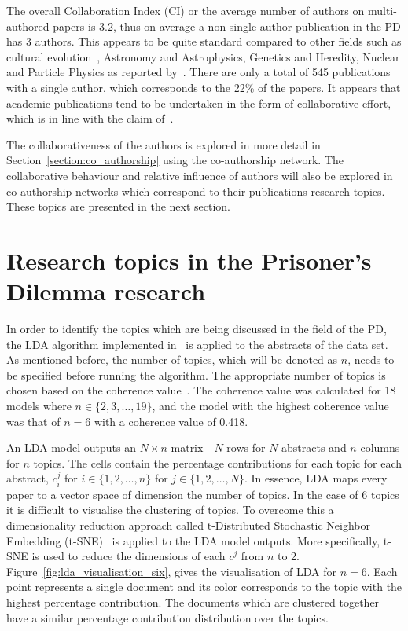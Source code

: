 \documentclass{article}
\theoremstyle{definition}
\begin{document}
The overall Collaboration Index (CI) or the average number of authors on
multi-authored papers is 3.2, thus on average a non single author publication in
the PD has 3 authors. This appears to be quite standard compared to other fields
such as cultural evolution~\cite{youngblood2018}, Astronomy and Astrophysics,
Genetics and Heredity, Nuclear and Particle Physics as reported
by~\cite{nature_author_blog}.
There are only a total of 545 publications with a single author, which
corresponds to the 22\% of the papers. It appears that academic publications
tend to be undertaken in the form of collaborative effort, which is in line
with the claim of~\cite{Kyvik2017}.

The collaborativeness of the authors is explored in more detail in
Section~\ref{section:co_authorship} using the co-authorship network. The
collaborative behaviour and relative influence of authors will also be explored
in co-authorship networks which correspond to their publications research topics.
These topics are presented in the next section.

\section{Research topics in the Prisoner's Dilemma research}\label{section:topics}

In order to identify the topics which are being discussed in the field of the
PD, the LDA algorithm implemented in~\cite{rehurek_lrec} is applied to the
abstracts of the data set. As mentioned before, the number of topics, which
will be denoted as \(n\), needs to be specified before running the algorithm.
The appropriate number of topics is chosen based on the coherence
value~\cite{Roder2015}. The coherence value was calculated for 18 models 
where \(n \in \{2, 3, \dots, 19\}\), and the model with the highest coherence value
was that of \(n=6\) with a coherence value of 0.418.

An LDA model outputs an \(N \times n\) matrix - \(N\) rows for \(N\)
abstracts and \(n\) columns for \(n\) topics. The cells contain the percentage
contributions for each topic for each abstract, \(c_i^ j\) for
\(i \in \{1, 2, \dots, n\}\) for \(j \in \{1, 2, \dots, N\}\). In essence,
LDA maps every paper to a vector space of dimension the number of topics. In the case
of 6 topics it is difficult to visualise the clustering of topics. To overcome
this a dimensionality reduction approach called t-Distributed Stochastic Neighbor Embedding
(t-SNE)~\cite{Maaten2008} is applied to the LDA model outputs. More specifically,
t-SNE is used to reduce the dimensions of each \(c^j\) from \(n\) to 2.
Figure~\ref{fig:lda_visualisation_six}, gives the visualisation of LDA for \(n=6\).
Each point represents a single document and its color corresponds to the topic
with the highest percentage contribution. The documents which are clustered
together have a similar percentage contribution distribution over the topics.
\end{document}
